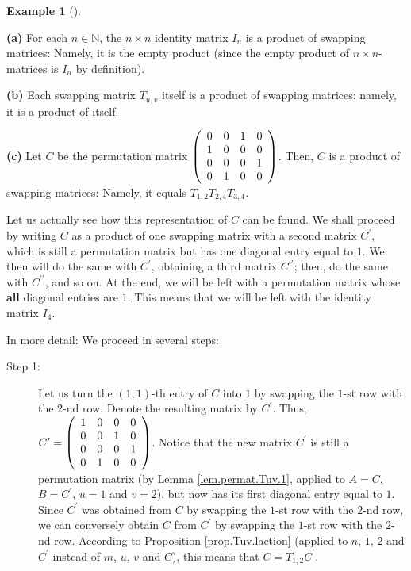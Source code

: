 \documentclass[numbers=enddot,12pt,final,onecolumn,notitlepage]{scrartcl}%
\theoremstyle{definition}
\newtheorem{exam}[theo]{Example}
\newenvironment{example}[1][]
{\begin{exam}[#1]\begin{leftbar}}
{\end{leftbar}\end{exam}}
\begin{document}
\begin{example}
\label{exam.thm.permat.Tuv}\textbf{(a)} For each $n\in\mathbb{N}$, the
$n\times n$ identity matrix $I_{n}$ is a product of swapping matrices: Namely,
it is the empty product (since the empty product of $n\times n$-matrices is
$I_{n}$ by definition).

\textbf{(b)} Each swapping matrix $T_{u,v}$ itself is a product of swapping
matrices: namely, it is a product of itself.

\textbf{(c)} Let $C$ be the permutation matrix $\left(
\begin{array}
[c]{cccc}%
0 & 0 & 1 & 0\\
1 & 0 & 0 & 0\\
0 & 0 & 0 & 1\\
0 & 1 & 0 & 0
\end{array}
\right)  $. Then, $C$ is a product of swapping matrices: Namely, it equals
$T_{1,2}T_{2,4}T_{3,4}$.

Let us actually see how this representation of $C$ can be found. We shall
proceed by writing $C$ as a product of one swapping matrix with a second
matrix $C^{\prime}$, which is still a permutation matrix but has one diagonal
entry equal to $1$. We then will do the same with $C^{\prime}$, obtaining a
third matrix $C^{\prime\prime}$; then, do the same with $C^{\prime\prime}$,
and so on. At the end, we will be left with a permutation matrix whose
\textbf{all} diagonal entries are $1$. This means that we will be left with
the identity matrix $I_{4}$.

In more detail: We proceed in several steps:

\begin{description}
\item[Step 1:] Let us turn the $\left(  1,1\right)  $-th entry of $C$ into $1$
by swapping the $1$-st row with the $2$-nd row. Denote the resulting matrix by
$C^{\prime}$. Thus, $C^{\prime}=\left(
\begin{array}
[c]{cccc}%
1 & 0 & 0 & 0\\
0 & 0 & 1 & 0\\
0 & 0 & 0 & 1\\
0 & 1 & 0 & 0
\end{array}
\right)  $. Notice that the new matrix $C^{\prime}$ is still a permutation
matrix (by Lemma \ref{lem.permat.Tuv.1}, applied to $A=C$, $B=C^{\prime}$,
$u=1$ and $v=2$), but now has its first diagonal entry equal to $1$. Since
$C^{\prime}$ was obtained from $C$ by swapping the $1$-st row with the $2$-nd
row, we can conversely obtain $C$ from $C^{\prime}$ by swapping the $1$-st row
with the $2$-nd row. According to Proposition \ref{prop.Tuv.laction} (applied
to $n$, $1$, $2$ and $C^{\prime}$ instead of $m$, $u$, $v$ and $C$), this
means that $C=T_{1,2}C^{\prime}$.


\end{description}
\end{example}
\end{document}

